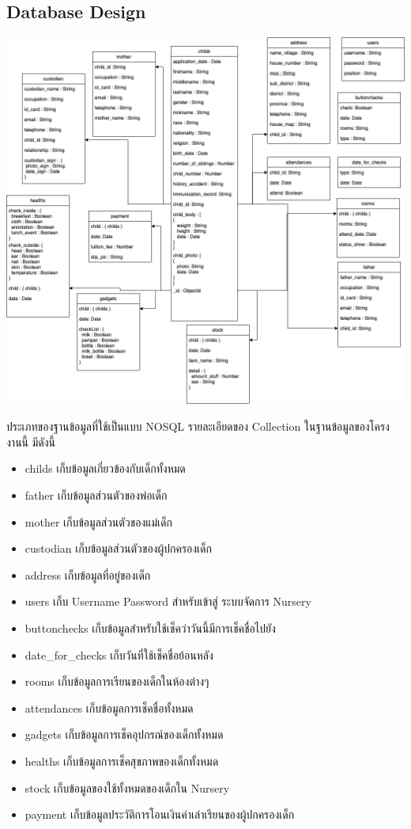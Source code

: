 \subsection{Database Design}
  \begin{center}
    \includegraphics[width=\linewidth]{images/databaseDiagram.png}
  \end{center}
    
  ประเภทของฐานข้อมูลที่ใช้เป็นแบบ NOSQL รายละเอียดของ Collection ในฐานข้อมูลของโครงงานนี้ มีดังนี้
  \begin{itemize}
    \item childs เก็บข้อมูลเกี่ยวข้องกับเด็กทั้งหมด 
    \item father เก็บข้อมูลส่วนตัวของพ่อเด็ก
    \item mother เก็บข้อมูลส่วนตัวของแม่เด็ก
    \item custodian เก็บข้อมูลส่วนตัวของผู้ปกครองเด็ก
    \item address เก็บข้อมูลที่อยู่ของเด็ก
    \item users เก็บ Username Password สำหรับเข้าสู่ ระบบจัดการ Nursery 
    \item buttonchecks เก็บข้อมูลสำหรับใช้เช็คว่าวันนี้มีการเช็คชื่อไปยัง
    \item date\_for\_checks เก็บวันที่ใช้เช็คชื่อย้อนหลัง
    \item rooms เก็บข้อมูลการเรียนของเด็กในห้องต่างๆ
    \item attendances เก็บข้อมูลการเช็คชื่อทั้งหมด
    \item gadgets เก็บข้อมูลการเช็คอุปกรณ์ของเด็กทั้งหมด
    \item healths เก็บข้อมูลการเช็คสุขภาพของเด็กทั้งหมด
    \item stock เก็บข้อมูลของใช้ทั้งหมดของเด็กใน Nursery 
    \item payment เก็บข้อมูลประวัติการโอนเงินค่าเล่าเรียนของผู้ปกครองเด็ก

  \end{itemize}

